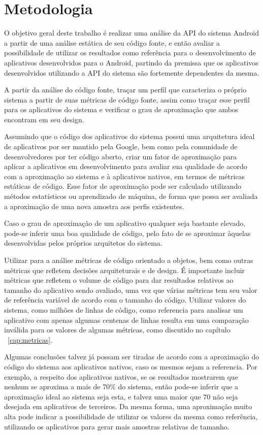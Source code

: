 \chapter{Metodologia}

O objetivo geral deste trabalho é realizar uma análise da API do sistema Android a partir de uma análise estática de seu código fonte, e então avaliar a possibilidade de utilizar os resultados como referência para o desenvolvimento de aplicativos desenvolvidos para o Android, partindo da premissa que os aplicativos desenvolvidos utilizando a API do sistema são fortemente dependentes da mesma.

A partir da análise do código fonte, traçar um perfil que caracteriza o próprio sistema a partir de suas métricas de código fonte, assim como traçar esse perfil para os aplicativos do sistema e verificar o grau de aproximação que ambos encontram em seu design. 

Assumindo que o código dos aplicativos do sistema possui uma arquitetura ideal de aplicativos por ser mantido pela Google, bem como pela comunidade de desenvolvedores por ter código aberto, criar um fator de aproximação para aplicar a aplicativos em desenvolvimento para avaliar sua qualidade de acordo com a aproximação ao sistema e à aplicativos nativos, em termos de métricas estáticas de código. Esse fator de aproximação pode ser calculado utilizando métodos estatísticos ou aprendizado de máquina, de forma que possa ser avaliada a aproximação de uma nova amostra aos perfis existentes.

Caso o grau de aproximação de um aplicativo qualquer seja bastante elevado, pode-se inferir uma boa qualidade de código, pelo fato de se aproximar àquelas desenvolvidas pelos próprios arquitetos do sistema.

Utilizar para a análise métricas de código orientado a objetos, bem como outras métricas que refletem decisões arquiteturais e de design. É importante incluir métricas que refletem o volume de código para dar resultados relativos ao tamanho do aplicativo sendo avaliado, uma vez que várias métricas tem seu valor de referência variável de acordo com o tamanho do código. Utilizar valores do sistema, como milhões de linhas de código, como referencia para analisar um aplicativo com apenas algumas centenas de linhas resulta em uma comparação inválida para os valores de algumas métricas, como discutido no capítulo ~\ref{cap:metricas}.

Algumas conclusões talvez já possam ser tiradas de acordo com a aproximação do código do sistema aos aplicativos nativos, caso os mesmos sejam a referencia. Por exemplo, a respeito dos aplicativos nativos, se os resultados mostrarem que nenhum se aproxima a mais de 70\% do sistema, então pode-se inferir que a aproximação ideal ao sistema seja esta, e talvez uma maior que 70 não seja desejada em aplicativos de terceiros. Da mesma forma, uma aproximação muito alta pode indicar a possibilidade de utilizar os valores da mesma como referência, utilizando os aplicativos para gerar mais amostras relativas de tamanho.

